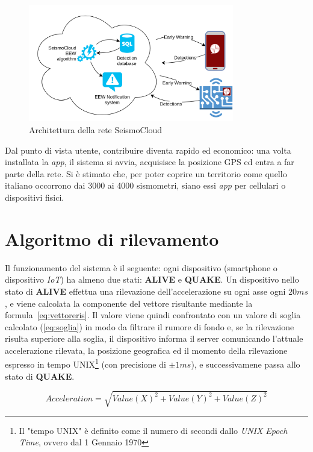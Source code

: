 \documentclass[a4paper,10pt]{memoir}
\begin{document}
\begin{figure}[ht]
\centering
\label{fig:scsarch}
\caption{Architettura della rete SeismoCloud}
\includegraphics[width=0.8\textwidth]{introduzione/SeismoCloud_arch}
\end{figure}

Dal punto di vista utente, contribuire diventa rapido ed economico: una volta installata la \textit{app}, il sistema si avvia, acquisisce la posizione GPS ed entra a far parte della rete. Si è stimato che, per poter coprire un territorio come quello italiano occorrono dai 3000 ai 4000 sismometri, siano essi \textit{app} per cellulari o dispositivi fisici.

\section{Algoritmo di rilevamento}

Il funzionamento del sistema è il seguente: ogni dispositivo (smartphone o dispositivo \textit{IoT}) ha almeno due stati: \textbf{ALIVE} e \textbf{QUAKE}. Un dispositivo nello stato di \textbf{ALIVE} effettua una rilevazione dell'accelerazione su ogni asse ogni $20ms$, e viene calcolata la componente del vettore risultante mediante la formula~\ref{eq:vettoreris}. Il valore viene quindi confrontato con un valore di soglia calcolato (\ref{eq:soglia}) in modo da filtrare il rumore di fondo e, se la rilevazione risulta superiore alla soglia, il dispositivo informa il server comunicando l'attuale accelerazione rilevata, la posizione geografica ed il momento della rilevazione espresso in tempo UNIX\footnote{Il "tempo UNIX" è definito come il numero di secondi dallo \textit{UNIX Epoch Time}, ovvero dal 1 Gennaio 1970} (con precisione di $\pm1ms$), e successivamene passa allo stato di \textbf{QUAKE}.

\begin{equation} \label{eq:vettoreris}
Acceleration = \sqrt{Value(X)^2 + Value(Y)^2 + Value(Z)^2}
\end{equation}
\end{document}

